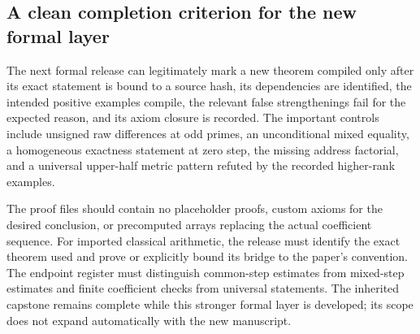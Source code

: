 \subsection{A clean completion criterion for the new formal layer}
The next formal release can legitimately mark a new theorem compiled only after its exact statement is bound to a source hash, its dependencies are identified, the intended positive examples compile, the relevant false strengthenings fail for the expected reason, and its axiom closure is recorded. The important controls include unsigned raw differences at odd primes, an unconditional mixed equality, a homogeneous exactness statement at zero step, the missing address factorial, and a universal upper-half metric pattern refuted by the recorded higher-rank examples.

The proof files should contain no placeholder proofs, custom axioms for the desired conclusion, or precomputed arrays replacing the actual coefficient sequence. For imported classical arithmetic, the release must identify the exact theorem used and prove or explicitly bound its bridge to the paper's convention. The endpoint register must distinguish common-step estimates from mixed-step estimates and finite coefficient checks from universal statements. The inherited capstone remains complete while this stronger formal layer is developed; its scope does not expand automatically with the new manuscript.
